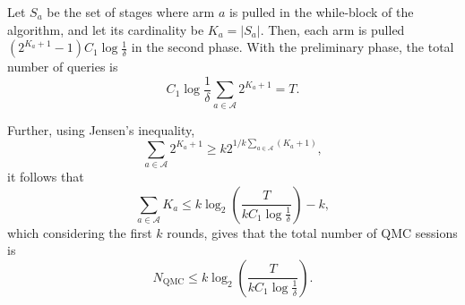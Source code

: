 Let $S_a$ be the set of stages where arm $a$ is pulled in the while-block of the algorithm, and let its cardinality be $K_a = |S_a|$.
Then, each arm is pulled $(2^{K_a + 1} - 1)C_1 \log \frac1\delta$ in the second phase.
With the preliminary phase, the total number of queries is
\begin{equation}
    C_1 \log \frac{1}{\delta} \sum_{a \in \mathcal{A}} 2^{K_a + 1} = T.
\end{equation}

Further, using Jensen's inequality,
\begin{equation}
    \sum_{a \in \mathcal{A}} 2^{K_a + 1} \geq k 2^{1/k \sum_{a \in \mathcal{A}} (K_a + 1)},
\end{equation}
it follows that
\begin{equation}
    \sum_{a \in \mathcal{A}} K_a
    \leq
    k \log_2 \left(\frac{T}{k C_1 \log \frac{1}{\delta}}\right) -k,
\end{equation}
which considering the first $k$ rounds, gives that the total number of QMC sessions is
\begin{equation}
    N_{\text{QMC}} \leq k \log_2 \left(\frac{T}{k C_1 \log \frac{1}{\delta}}\right).
\end{equation}

